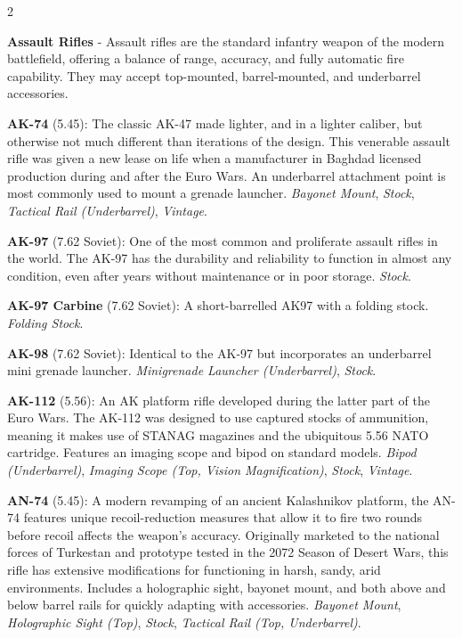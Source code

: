 \documentclass[
  oneside]{article}
\begin{document}
\begin{multicols}{2}

\textbf{Assault Rifles} - Assault rifles are the
standard infantry weapon of the modern
battlefield, offering a balance of range,
accuracy, and fully automatic fire capability.
They may accept top-mounted, barrel-mounted, and
underbarrel accessories.

\textbf{AK-74} (5.45): The classic AK-47 made
lighter, and in a lighter caliber, but otherwise
not much different than iterations of the design.
This venerable assault rifle was given a new lease
on life when a manufacturer in Baghdad licensed
production during and after the Euro Wars. An
underbarrel attachment point is most commonly used
to mount a grenade launcher. \emph{Bayonet Mount},
\emph{Stock}, \emph{Tactical Rail (Underbarrel)},
\emph{Vintage}.

\textbf{AK-97} (7.62 Soviet): One of the most
common and proliferate assault rifles in the
world. The AK-97 has the durability and
reliability to function in almost any condition,
even after years without maintenance or in poor
storage. \emph{Stock}.

\textbf{AK-97 Carbine} (7.62 Soviet): A
short-barrelled AK97 with a folding stock.
\emph{Folding Stock}.

\textbf{AK-98} (7.62 Soviet): Identical to the
AK-97 but incorporates an underbarrel mini grenade
launcher. \emph{Minigrenade Launcher
(Underbarrel)}, \emph{Stock}.

\textbf{AK-112} (5.56): An AK platform rifle
developed during the latter part of the Euro Wars.
The AK-112 was designed to use captured stocks of
ammunition, meaning it makes use of STANAG
magazines and the ubiquitous 5.56 NATO cartridge.
Features an imaging scope and bipod on standard
models. \emph{Bipod (Underbarrel)}, \emph{Imaging
Scope (Top, Vision Magnification)}, \emph{Stock},
\emph{Vintage}.

\textbf{AN-74} (5.45): A modern revamping of an
ancient Kalashnikov platform, the AN-74 features
unique recoil-reduction measures that allow it to
fire two rounds before recoil affects the weapon's
accuracy. Originally marketed to the national
forces of Turkestan and prototype tested in the
2072 Season of Desert Wars, this rifle has
extensive modifications for functioning in harsh,
sandy, arid environments. Includes a holographic
sight, bayonet mount, and both above and below
barrel rails for quickly adapting with
accessories. \emph{Bayonet Mount},
\emph{Holographic Sight (Top)}, \emph{Stock},
\emph{Tactical Rail (Top, Underbarrel)}.


\end{multicols}
\end{document}
